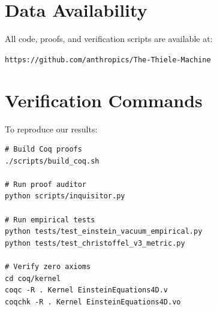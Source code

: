 \documentclass[11pt,twocolumn]{article}
\begin{document}
\section*{Data Availability}

All code, proofs, and verification scripts are available at:

\texttt{https://github.com/anthropics/The-Thiele-Machine}

\section*{Verification Commands}

To reproduce our results:
\begin{verbatim}
# Build Coq proofs
./scripts/build_coq.sh

# Run proof auditor
python scripts/inquisitor.py

# Run empirical tests
python tests/test_einstein_vacuum_empirical.py
python tests/test_christoffel_v3_metric.py

# Verify zero axioms
cd coq/kernel
coqc -R . Kernel EinsteinEquations4D.v
coqchk -R . Kernel EinsteinEquations4D.vo
\end{verbatim}
\end{document}
